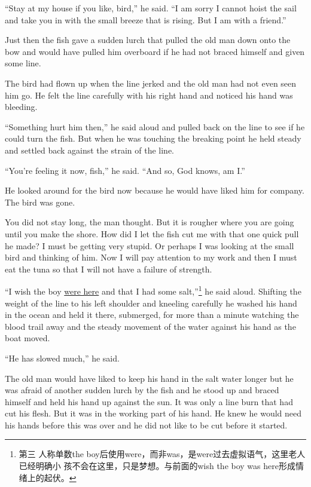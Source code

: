 \documentclass[fontset=ubuntu]{ctexrep}
\begin{document}
``Stay at my house if you like, bird,'' he said. ``I am sorry I cannot
\gls{hoist} the sail and take you in with the small breeze that is rising.
But I am with a friend.''

Just then the fish gave a sudden lurch that pulled the old man down onto the
bow and would have pulled him \gls{overboard} if he had not braced himself and
given some line.

The bird had flown up when the line jerked and the old man had not even seen
him go. He felt the line carefully with his right hand and \gls{noticed} his
hand was bleeding.

``Something hurt him then,'' he said aloud and pulled back on the line to
see if he could turn the fish. But when he was touching the breaking point
he held steady and settled back against the strain of the line.

``You're feeling it now, fish,'' he said. ``And so, God knows, am I.''

He looked around for the bird now because he would have liked him for
\gls{company}. The bird was gone.

You did not stay long, the man thought. But it is rougher where you are
going until you make the shore. How did I let the fish cut me with that one
quick pull he made? I must be getting very stupid. Or perhaps I was looking
at the small bird and thinking of him. Now I will pay \gls{attention} to my work
and then I must eat the tuna so that I will not have a \gls{failure} of strength.

``I wish the boy \uline{were here} and that I had some salt,''\footnote{第三
  人称单数the boy后使用were，而非was，是were过去虚拟语气，这里老人已经明确小
  孩不会在这里，只是梦想。与前面的wish the boy was here形成情绪上的起伏。}
he said aloud. Shifting the weight of the line to his left shoulder and
\gls{kneel}ing carefully he washed his hand in the ocean and held it there,
\gls{submerged}, for more than a minute watching the blood trail away and
the steady movement of the water against his hand as the boat moved.

``He has slowed much,'' he said.

The old man would have liked to keep his hand in the salt water longer but
he was afraid of another sudden lurch by the fish and he stood up and braced
himself and held his hand up against the sun. It was only a line burn that
had cut his flesh. But it was in the working part of his hand. He knew he
would need his hands before this was over and he did not like to be cut
before it started.
\end{document}
